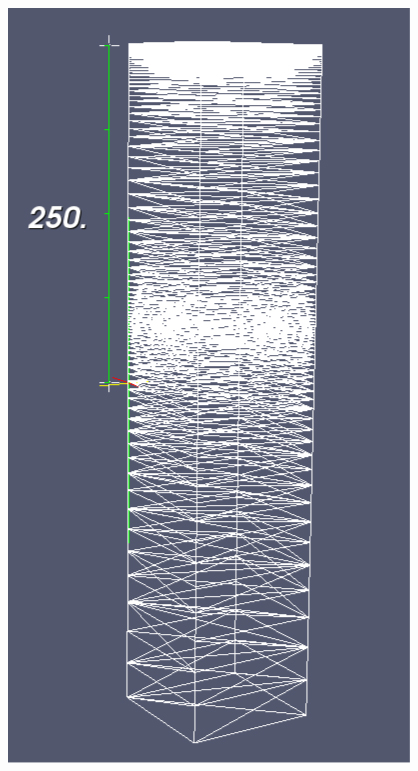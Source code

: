 \documentclass[t]{beamer}
\begin{document}
\begin{frame}[c]

\begin{figure}[H]
  \begin{center}
    \includegraphics[height=0.9\textheight,natwidth=402,natheight=755]{images/fluidity-mesh.jpg}
  \end{center}
\end{figure}

\end{frame}
\end{document}
